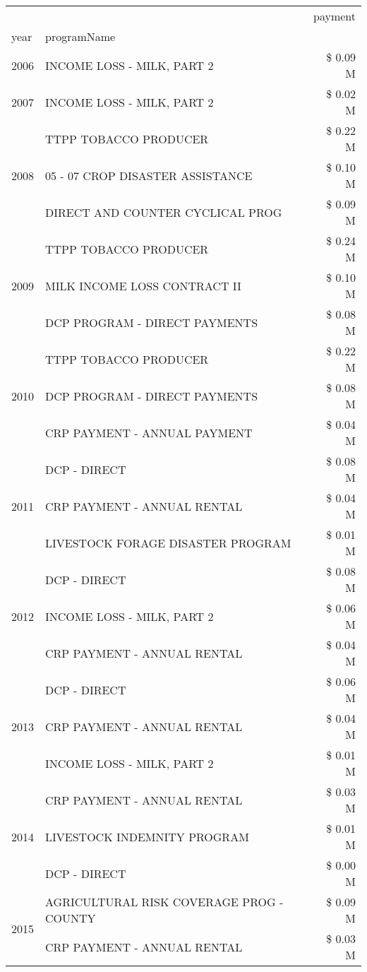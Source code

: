 \begin{tabular}{llr}
\toprule
 &  & payment \\
year & programName &  \\
\midrule
2006 & INCOME LOSS - MILK, PART 2 & \$ 0.09 M \\
\cline{1-3}
2007 & INCOME LOSS - MILK, PART 2 & \$ 0.02 M \\
\cline{1-3}
\multirow[t]{3}{*}{2008} & TTPP TOBACCO PRODUCER & \$ 0.22 M \\
 & 05 - 07 CROP DISASTER ASSISTANCE & \$ 0.10 M \\
 & DIRECT AND COUNTER CYCLICAL PROG & \$ 0.09 M \\
\cline{1-3}
\multirow[t]{3}{*}{2009} & TTPP TOBACCO PRODUCER & \$ 0.24 M \\
 & MILK INCOME LOSS CONTRACT II & \$ 0.10 M \\
 & DCP PROGRAM - DIRECT PAYMENTS & \$ 0.08 M \\
\cline{1-3}
\multirow[t]{3}{*}{2010} & TTPP TOBACCO PRODUCER & \$ 0.22 M \\
 & DCP PROGRAM - DIRECT PAYMENTS & \$ 0.08 M \\
 & CRP PAYMENT - ANNUAL PAYMENT & \$ 0.04 M \\
\cline{1-3}
\multirow[t]{3}{*}{2011} & DCP - DIRECT & \$ 0.08 M \\
 & CRP PAYMENT - ANNUAL RENTAL & \$ 0.04 M \\
 & LIVESTOCK FORAGE DISASTER PROGRAM & \$ 0.01 M \\
\cline{1-3}
\multirow[t]{3}{*}{2012} & DCP - DIRECT & \$ 0.08 M \\
 & INCOME LOSS - MILK, PART 2 & \$ 0.06 M \\
 & CRP PAYMENT - ANNUAL RENTAL & \$ 0.04 M \\
\cline{1-3}
\multirow[t]{3}{*}{2013} & DCP - DIRECT & \$ 0.06 M \\
 & CRP PAYMENT - ANNUAL RENTAL & \$ 0.04 M \\
 & INCOME LOSS - MILK, PART 2 & \$ 0.01 M \\
\cline{1-3}
\multirow[t]{3}{*}{2014} & CRP PAYMENT - ANNUAL RENTAL & \$ 0.03 M \\
 & LIVESTOCK INDEMNITY PROGRAM & \$ 0.01 M \\
 & DCP - DIRECT & \$ 0.00 M \\
\cline{1-3}
\multirow[t]{3}{*}{2015} & AGRICULTURAL RISK COVERAGE PROG - COUNTY & \$ 0.09 M \\
 & CRP PAYMENT - ANNUAL RENTAL & \$ 0.03 M \\

\end{tabular}
